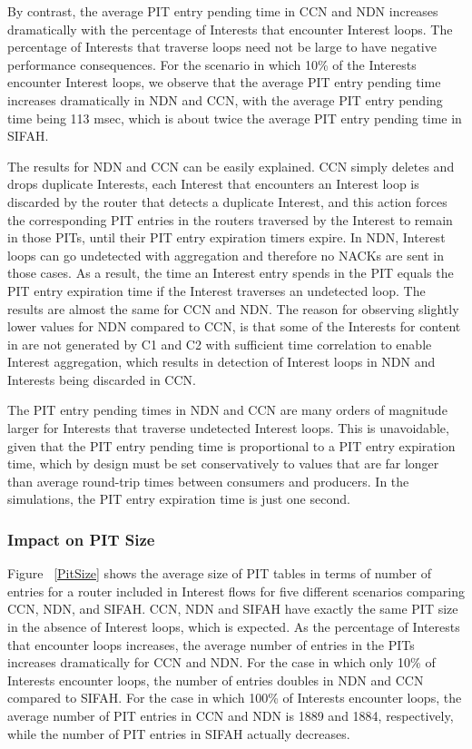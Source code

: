 \documentclass{ancs15-alternate}
\begin{document}
By contrast, the average PIT entry pending time in CCN and NDN increases dramatically with the percentage of  Interests that 
encounter  Interest loops. The percentage of Interests that traverse loops need not be large to have negative performance consequences. For the scenario in which  10\%  of the Interests 
encounter Interest  loops, we observe that the average PIT entry pending time increases dramatically in NDN and CCN, with the average PIT entry pending time being 113 msec, which is about twice the average PIT entry pending time in SIFAH.  

The results for NDN and CCN can be easily explained. CCN simply deletes and drops duplicate Interests, each Interest that encounters an Interest loop is discarded by the router that detects a duplicate Interest, and this action forces the corresponding PIT entries in the routers traversed by the Interest to remain in those PITs, until their PIT entry expiration timers expire. 
In NDN, Interest loops  can go undetected with aggregation and therefore no NACKs are sent in those cases. As a result, the time an Interest entry spends in the PIT  equals the PIT entry expiration time if the Interest traverses an undetected loop.
The results are almost the same for CCN and NDN. The reason for observing slightly lower values for NDN compared to CCN, is that some of the Interests for content in  are not generated by C1 and C2 with sufficient time correlation to enable  Interest aggregation, which results in detection of Interest loops in NDN and Interests being discarded in CCN.

The PIT entry pending times in NDN and CCN are many orders of magnitude larger for Interests that traverse undetected Interest loops. This is unavoidable,  given that the PIT entry pending time is  proportional to a PIT entry expiration time, which by design must be set conservatively to values that are far longer than average round-trip times between consumers and producers. 
In the simulations, the PIT entry expiration time is just one second.

\subsubsection{Impact on PIT Size}

Figure ~\ref{PitSize} shows the average size of PIT tables in terms of number of entries for a router included in Interest  flows for five different scenarios comparing CCN, NDN, and SIFAH. CCN, NDN and SIFAH have exactly the same PIT size in the absence of Interest loops, which is expected. As the  percentage of Interests that  encounter loops increases, the average number of entries in the PITs increases dramatically for CCN and NDN. For the case in which  only 10\%  of Interests encounter loops,  the number of entries doubles in NDN and CCN compared to SIFAH. For the case in which  100\% of Interests encounter loops, the average number of PIT entries in CCN and NDN is 1889 and 1884, respectively,  while the number of  PIT entries in SIFAH 
actually decreases. 
\end{document}
